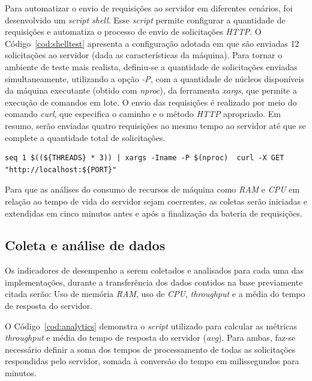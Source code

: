 \documentclass[12pt]{article}
\begin{document}
Para automatizar o envio de requisições ao servidor em diferentes cenários, 
foi desenvolvido um \textit{script shell}. Esse \textit{script} permite configurar a quantidade de 
requisições e automatiza o processo de envio de solicitações \textit{HTTP}. O Código~\ref{cod:shelltest} 
apresenta a configuração adotada em que são enviadas 12 solicitações ao servidor (dada as características da máquina). 
Para tornar o ambiente de teste mais realista, definiu-se a quantidade de solicitações enviadas simultaneamente, 
utilizando a opção \textit{-P}, com a quantidade de núcleos disponíveis da máquina executante (obtido com \textit{nproc}), 
da ferramenta \textit{xargs}, que permite a execução de comandos em lote. O envio 
das requisições é realizado por meio do comando \textit{curl}, que especifica o caminho e o método \textit{HTTP} apropriado.
Em resumo, serão enviadas quatro requisições ao mesmo tempo ao servidor até que se complete a quantidade total de solicitações.

\begin{lstlisting}[caption={\textit{Script} para disparo de requisições}, label=cod:shelltest]
	seq 1 $((${THREADS} * 3)) | xargs -Iname -P $(nproc)  curl -X GET "http://localhost:${PORT}"
\end{lstlisting}

Para que as análises do consumo de recursos de máquina como \textit{RAM} e \textit{CPU} em relação
ao tempo de vida do servidor sejam coerrentes, as coletas serão iniciadas e extendidas em cinco 
minutos antes e após a finalização da bateria de requisições.


\subsection{Coleta e análise de dados}

Os indicadores de desempenho a serem coletados e analisados para cada uma das implementações, durante a transferência
dos dados contidos na base previamente citada serão: Uso de memória \textit{RAM}, uso de \textit{CPU}, \textit{throughput}
e a média do tempo de resposta do servidor.

O Código~\ref{cod:analytics} demonstra o \textit{script} utilizado para calcular as métricas \textit{throughput} e 
média do tempo de resposta do servidor (\textit{avg}). Para ambas, faz-se necessário definir a soma dos tempos de processamento de
todas as solicitações respondidas pelo servidor, somada à conversão do tempo em milissegundos para minutos.
\end{document}
